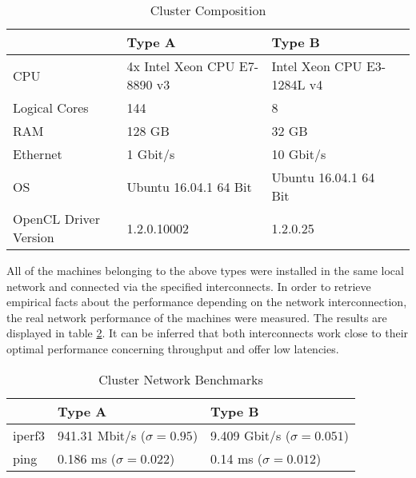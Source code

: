 \begin{table}[!htb]
	\centering
	\begin{adjustbox}{width=0.7\textwidth}
		\small
		\begin{tabular}{l | l | l | l}
			~                     & Type A                  	& Type B                  \\
			\hline
			CPU                   &  4x Intel Xeon CPU E7-8890 v3 	& Intel Xeon CPU E3-1284L v4 \\
			Logical Cores         &  144 	& 8 \\
			RAM                   &  128 GB                       	& 32 GB                       \\
			Ethernet	          &  1 Gbit/s                  	& 10 Gbit/s                  \\
			OS                    &  Ubuntu 16.04.1 64 Bit      	& Ubuntu 16.04.1 64 Bit      \\
			OpenCL Driver Version &  1.2.0.10002                   & 1.2.0.25                   \\
		\end{tabular}
	\end{adjustbox}

	\caption{Cluster Composition}
	\label{table:cluster_setup_1}
\end{table}

All of the machines belonging to the above types were installed in the same local network and connected via the specified interconnects. In order to retrieve empirical facts about the performance depending on the network interconnection, the real network performance of the machines were measured. The results are displayed in table \ref{table:cluster_interconnect_benchmarks}. It can be inferred that both interconnects work close to their optimal performance concerning throughput and offer low latencies.

\begin{table}[!htb]
	\centering
	\begin{adjustbox}{width=0.5\textwidth}
		\small
		\begin{tabular}{l | l | l}
			~                     & Type A                 			& Type B                  \\
			\hline
			iperf3                & 941.31 Mbit/s ($\sigma = 0.95$) 	& 9.409 Gbit/s ($\sigma = 0.051$) \\
			ping                  & 0.186 ms ($\sigma = 0.022$)  		& 0.14 ms ($\sigma = 0.012$)  \\
		\end{tabular}
	\end{adjustbox}

	\caption{Cluster Network Benchmarks}
	\label{table:cluster_interconnect_benchmarks}
\end{table}

